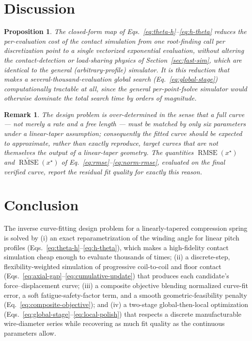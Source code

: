 \documentclass[11pt]{article}
\newtheorem{proposition}{Proposition}
\newtheorem{remark}{Remark}
\DeclareMathOperator{\RMSE}{RMSE}
\begin{document}
\section{Discussion}

\begin{proposition}
The closed-form map of Eqs.~\eqref{eq:theta-h}--\eqref{eq:h-theta}
reduces the per-evaluation cost of the contact simulation from one
root-finding call per discretization point to a single vectorized
exponential evaluation, without altering the contact-detection or
load-sharing physics of Section~\ref{sec:fast-sim}, which are identical
to the general (arbitrary-profile) simulator. It is this reduction that
makes a several-thousand-evaluation global search
(Eq.~\eqref{eq:global-stage}) computationally tractable at all, since the
general per-point-fsolve simulator would otherwise dominate the total
search time by orders of magnitude.
\end{proposition}

\begin{remark}
The design problem is over-determined in the sense that a full curve —
not merely a rate and a free length — must be matched by only six
parameters under a linear-taper assumption; consequently the fitted
curve should be expected to approximate, rather than exactly reproduce,
target curves that are not themselves the output of a linear-taper
geometry. The quantities $\RMSE(x^{\star})$ and
$\widetilde{\RMSE}(x^{\star})$ of Eq.~\eqref{eq:rmse}--\eqref{eq:norm-rmse},
evaluated on the final verified curve, report the residual fit quality
for exactly this reason.
\end{remark}

\section{Conclusion}

The inverse curve-fitting design problem for a linearly-tapered
compression spring is solved by (i) an exact reparametrization of the
winding angle for linear pitch profiles
(Eqs.~\eqref{eq:theta-h}--\eqref{eq:h-theta}), which makes a
high-fidelity contact simulation cheap enough to evaluate thousands of
times; (ii) a discrete-step, flexibility-weighted simulation of
progressive coil-to-coil and floor contact
(Eqs.~\eqref{eq:axial-gap}--\eqref{eq:cumulative-update}) that produces
each candidate's force--displacement curve; (iii) a composite objective
blending normalized curve-fit error, a soft fatigue-safety-factor term,
and a smooth geometric-feasibility penalty
(Eq.~\eqref{eq:composite-objective}); and (iv) a two-stage
global-then-local optimization (Eqs.~\eqref{eq:global-stage}--\eqref{eq:local-polish})
that respects a discrete manufacturable wire-diameter series while
recovering as much fit quality as the continuous parameters allow.
\end{document}
